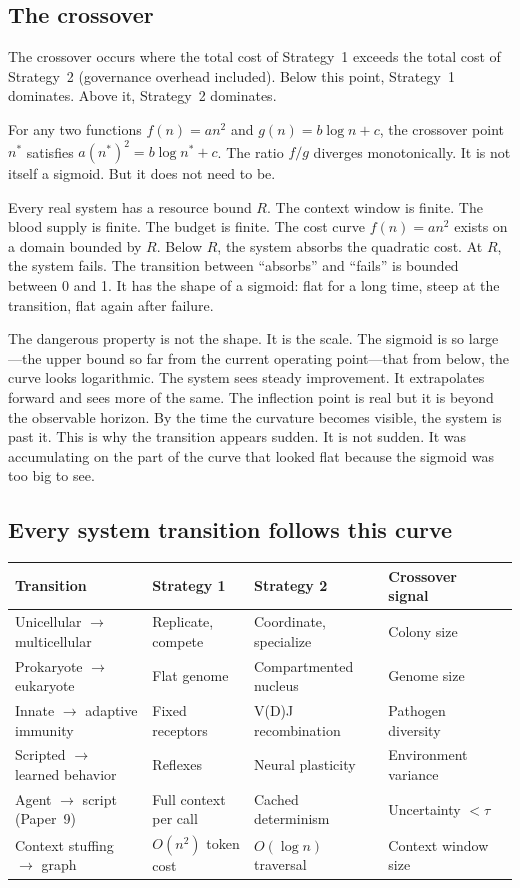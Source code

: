 \documentclass[11pt]{article}
\theoremstyle{definition}
\begin{document}
\subsection{The crossover}

The crossover occurs where the total cost of Strategy~1 exceeds
the total cost of Strategy~2 (governance overhead included).
Below this point, Strategy~1 dominates. Above it, Strategy~2
dominates.

For any two functions $f(n) = an^2$ and $g(n) = b \log n + c$,
the crossover point $n^*$ satisfies $a(n^*)^2 = b \log n^* + c$.
The ratio $f/g$ diverges monotonically. It is not itself a sigmoid.
But it does not need to be.

Every real system has a resource bound $R$. The context window is
finite. The blood supply is finite. The budget is finite. The cost
curve $f(n) = an^2$ exists on a domain bounded by $R$. Below $R$,
the system absorbs the quadratic cost. At $R$, the system fails.
The transition between ``absorbs'' and ``fails'' is bounded between
0 and 1. It has the shape of a sigmoid: flat for a long time, steep
at the transition, flat again after failure.

The dangerous property is not the shape. It is the scale. The
sigmoid is so large---the upper bound so far from the current
operating point---that from below, the curve looks logarithmic.
The system sees steady improvement. It extrapolates forward and
sees more of the same. The inflection point is real but it is
beyond the observable horizon. By the time the curvature becomes
visible, the system is past it. This is why the transition appears
sudden. It is not sudden. It was accumulating on the part of the
curve that looked flat because the sigmoid was too big to see.

\subsection{Every system transition follows this curve}

\begin{center}
\small
\begin{tabular}{lllll}
\toprule
\textbf{Transition} & \textbf{Strategy 1} & \textbf{Strategy 2} & \textbf{Crossover signal} \\
\midrule
Unicellular $\to$ multicellular & Replicate, compete & Coordinate, specialize & Colony size \\
Prokaryote $\to$ eukaryote & Flat genome & Compartmented nucleus & Genome size \\
Innate $\to$ adaptive immunity & Fixed receptors & V(D)J recombination & Pathogen diversity \\
Scripted $\to$ learned behavior & Reflexes & Neural plasticity & Environment variance \\
Agent $\to$ script (Paper~9) & Full context per call & Cached determinism & Uncertainty $< \tau$ \\
Context stuffing $\to$ graph & $O(n^2)$ token cost & $O(\log n)$ traversal & Context window size \\
\bottomrule
\end{tabular}
\end{center}
\end{document}
